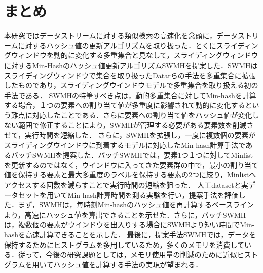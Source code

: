 \chapter{まとめ}
 本研究ではデータストリームに対する類似検索の高速化を念頭に，データストリームに対するハッシュ値の更新アルゴリズムを取り扱った．とくにスライディングウィンドウを動的に変化する多重集合と見なして，スライディングウィンドウに対するMin-Hashのハッシュ値更新アルゴリズムSWMHを提案した．SWMHはスライディングウィンドウで集合を取り扱ったDatarらの手法を多重集合に拡張したものであり，スライディングウインドウモデルで多重集合を取り扱える初の手法である．
  SWMHの特筆すべき点は，動的多重集合に対してMin-hashを計算する場合，１つの要素への割り当て値が多重度に影響されて動的に変化するという難点に対応したことである．さらに要素への割り当て値をハッシュ値が変化しない範囲で修正することにより，SWMHが管理する必要がある要素数を削減させて，実行時間を短縮した．
さらに，SWMHを拡張し，一度に複数個の要素がスライディングウインドウに到着するモデルに対応したMin-hash計算手法であるバッチSWMHを提案した．バッチSWMHでは，要素1つ１つに対してMinlistを更新するのではなく，ウインドウに入ってきた要素群の中で，最小の割り当て値を保持する要素と最大多重度のラベルを保持する要素の2つに絞り，Minlistへアクセスする回数を減らすことで実行時間の短縮を狙った．
 人工datasetと実データセットを用いてMin-hash計算時間を測る実験を行い，提案手法を評価した．まず，SWMHは，毎時刻Min-hashのハッシュ値を再計算するベースラインより，高速にハッシュ値を算出できることを示せた．さらに，バッチSWMHは，複数個の要素がウインドウを出入りする場合にSWMHより短い時間でMin-hashを高速計算できることを示した．
 最後に，提案手法SWMHでは，データを保持するためにヒストグラムを多用しているため，多くのメモリを消費している．従って，今後の研究課題としては，メモリ使用量の削減のために近似ヒストグラムを用いてハッシュ値を計算する手法の実現が望まれる．